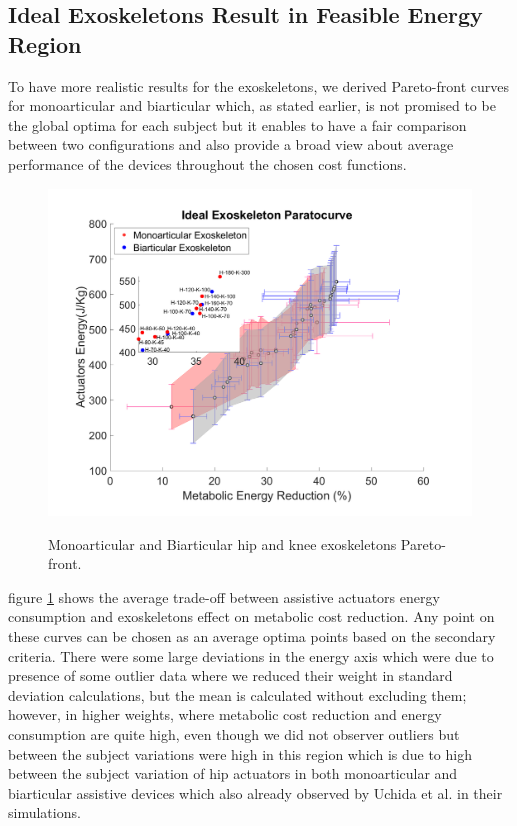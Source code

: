 \documentclass[10pt,letterpaper]{article}
\begin{document}
\subsection*{Ideal Exoskeletons Result in Feasible Energy Region}
To have more realistic results for the exoskeletons, we derived Pareto-front curves for monoarticular and biarticular which, as stated earlier, is not promised to be the global optima for each subject but it enables to have a fair comparison between two configurations and also provide a broad view about average performance of the devices throughout the chosen cost functions.
\begin{figure}[!h]
	\centering
	\vspace{-1.\baselineskip}    
	{\includegraphics[width=\columnwidth]{Ideal_Exo_ParetoOpt_Figures/Paretofront.pdf}}
	\caption{Monoarticular and Biarticular hip and knee exoskeletons Pareto-front.}
	\label{Fig_Paretofront}
\end{figure}
figure \ref{Fig_Paretofront} shows the average trade-off between assistive actuators energy consumption and exoskeletons effect on metabolic cost reduction. Any point on these curves can be chosen as an average optima points based on the secondary criteria.
There were some large deviations in the energy axis which were due to presence of some outlier data where we reduced their weight in standard deviation calculations, but the mean is calculated without excluding them; however, in higher weights, where metabolic cost reduction and energy consumption are quite high, even though we did not observer outliers but between the subject variations were high in this region which is due to high between the subject variation of hip actuators in both monoarticular and biarticular assistive devices which also already observed by Uchida et al. \cite{2} in their simulations.\\
\end{document}
